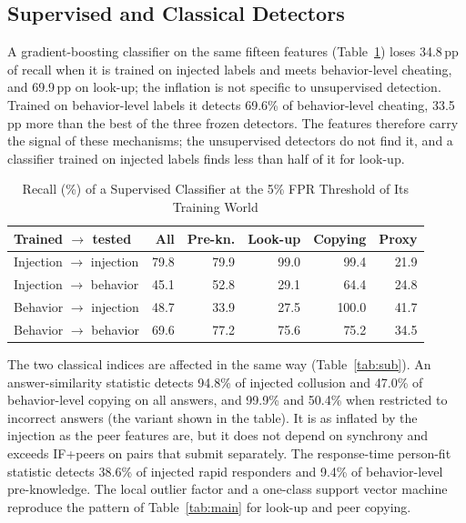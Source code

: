 \documentclass[conference,a4paper]{IEEEtran}
\newcommand{\pp}{\,pp}
\begin{document}
\subsection{Supervised and Classical Detectors}
A gradient-boosting classifier on the same fifteen features (Table~\ref{tab:sup}) loses 34.8\pp{} of recall when it is trained on injected labels and meets behavior-level cheating, and 69.9\pp{} on look-up; the inflation is not specific to unsupervised detection. Trained on behavior-level labels it detects 69.6\% of behavior-level cheating, 33.5\pp{} more than the best of the three frozen detectors. The features therefore carry the signal of these mechanisms; the unsupervised detectors do not find it, and a classifier trained on injected labels finds less than half of it for look-up.

\begin{table}[t]
\caption{Recall (\%) of a Supervised Classifier at the 5\% FPR Threshold of Its Training World}
\label{tab:sup}
\centering
\footnotesize
\begin{tabular}{@{}lrrrrr@{}}
\toprule
Trained $\rightarrow$ tested & All & Pre-kn. & Look-up & Copying & Proxy \\
\midrule
Injection $\rightarrow$ injection & 79.8 & 79.9 & 99.0 & 99.4 & 21.9 \\
Injection $\rightarrow$ behavior & 45.1 & 52.8 & 29.1 & 64.4 & 24.8 \\
Behavior $\rightarrow$ injection & 48.7 & 33.9 & 27.5 & 100.0 & 41.7 \\
Behavior $\rightarrow$ behavior & 69.6 & 77.2 & 75.6 & 75.2 & 34.5 \\
\bottomrule
\end{tabular}
\end{table}

The two classical indices are affected in the same way (Table~\ref{tab:sub}). An answer-similarity statistic detects 94.8\% of injected collusion and 47.0\% of behavior-level copying on all answers, and 99.9\% and 50.4\% when restricted to incorrect answers (the variant shown in the table). It is as inflated by the injection as the peer features are, but it does not depend on synchrony and exceeds IF+peers on pairs that submit separately. The response-time person-fit statistic detects 38.6\% of injected rapid responders and 9.4\% of behavior-level pre-knowledge. The local outlier factor \cite{breunig2000lof} and a one-class support vector machine \cite{scholkopf2001support} reproduce the pattern of Table~\ref{tab:main} for look-up and peer copying.
\end{document}
